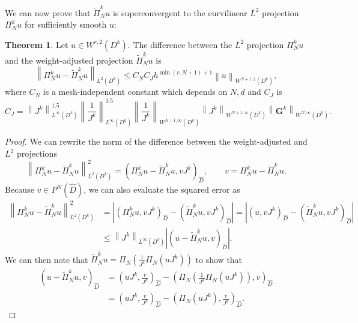 \documentclass[preprint,10pt]{article}
\theoremstyle{definition}
\theoremstyle{lemma}
\theoremstyle{theorem}
\newtheorem{theorem}{Theorem}
\theoremstyle{assumption}
\renewcommand{\hat}{\widehat}
\renewcommand{\tilde}{\widetilde}
\newcommand{\nor}[1]{\left\| #1 \right\|}
\newcommand{\LRp}[1]{\left( #1 \right)}
\newcommand{\LRb}[1]{\left| #1 \right|}
\begin{document}
{We can now prove that $\tilde{\Pi}^k_N u$ is superconvergent to the curvilinear $L^2$ projection $\Pi_N^k u$ for sufficiently smooth $u$:
\begin{theorem}
Let $u \in W^{r,2}\LRp{D^k}$.  The difference between the $L^2$ projection $\Pi^k_Nu$ and the weight-adjusted projection $\tilde{\Pi}^k_N u$ is
\[
\nor{\Pi_N^k u - \tilde{\Pi}^k_N  u}_{L^2\LRp{D^k}} \leq C_N C_J h^{\min\LRp{r,N+1}+1}\nor{u}_{W^{N+1,2}\LRp{D^k}},
\]
where $C_N$ is a mesh-independent constant which depends on $N, d$ and $C_J$ is
\[
C_J = \nor{J^k}_{L^{\infty}\LRp{D^k}}^{1.5}  \nor{\frac{1}{J^k}}_{L^{\infty}\LRp{D^k}}^{1.5} \nor{\frac{1}{J^k}}_{W^{N+1,\infty}\LRp{D^k}}\nor{J^k}_{W^{N+1,\infty}\LRp{D^k}}\nor{\bm{G}^k}_{W^{N,\infty}\LRp{D^k}}.
\]
\label{thm:superconverge}
\end{theorem}
\begin{proof}
We can rewrite the norm of the difference between the weight-adjusted and $L^2$ projections
\[
\nor{\Pi_N^k  u - \tilde{\Pi}^k_N  u}_{L^2\LRp{D^k}}^2 = \LRp{\Pi_N^k  u - \tilde{\Pi}^k_N  u,vJ^k}_{\hat{D}}, \qquad v = \Pi_N^k  u - \tilde{\Pi}^k_N  u.
\]
Because $v \in P^N\LRp{\hat{D}}$, we can also evaluate the squared error as
\begin{align*}
\nor{\Pi_N^k  u - \tilde{\Pi}^k_N  u}_{L^2\LRp{D^k}}^2 &= \LRb{\LRp{\Pi_N^k u,vJ^k}_{\hat{D}} - \LRp{\tilde{\Pi}^k_N  u,vJ^k}_{\hat{D}}} = \LRb{\LRp{u,vJ^k}_{\hat{D}} - \LRp{\tilde{\Pi}^k_N  u,vJ^k}_{\hat{D}}} \\
&\leq \nor{J^k}_{L^{\infty}\LRp{D^k}} \LRb{\LRp{u-\tilde{\Pi}^k_Nu,v}_{\hat{D}}}.%
\end{align*}
We can then note that $\tilde{\Pi}^k_Nu = \Pi_N\LRp{\frac{1}{J^k} \Pi_N\LRp{uJ^k}}$ to show that
\begin{align*}
{\LRp{u-\tilde{\Pi}^k_Nu,v}_{\hat{D}}} &= {\LRp{uJ^k,\frac{v}{J^k}}_{\hat{D}}-\LRp{\Pi_N\LRp{\frac{1}{J^k} \Pi_N\LRp{uJ^k}},v}_{\hat{D}}} \\
&= \LRp{uJ^k,\frac{v}{J^k}}_{\hat{D}}-\LRp{\Pi_N\LRp{uJ^k},\frac{v}{J^k}}_{\hat{D}}. %

\end{align*}
\end{proof}}
\end{document}

